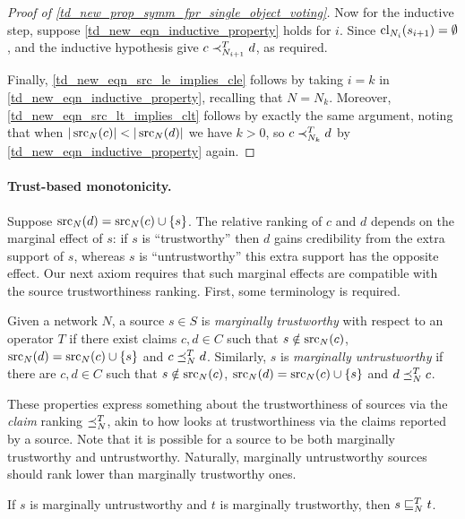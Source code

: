 \begin{proof}[Proof of \cref{td_new_prop_symm_fpr_single_object_voting}]
    Now for the inductive step, suppose \cref{td_new_eqn_inductive_property}
    holds for $i$. Since $\operatorname{cl}_{N_i}(s_{i + 1}) = \emptyset$,
    \freshposresp{} and the inductive hypothesis give $c \prec_{N_{i + 1}}^T d$,
    as required.

    Finally, \cref{td_new_eqn_src_le_implies_cle} follows by taking $i = k$ in
    \cref{td_new_eqn_inductive_property}, recalling that $N = N_k$. Moreover,
    \cref{td_new_eqn_src_lt_implies_clt} follows by exactly the same argument,
    noting that when $|\operatorname{src}_N(c)| < |\operatorname{src}_N(d)|$ we have $k > 0$, so $c
    \prec_{N_k}^T d$ by \cref{td_new_eqn_inductive_property} again.
\end{proof}

\paragraph{Trust-based monotonicity.}

Suppose $\operatorname{src}_N(d) = \operatorname{src}_N(c) \cup \{s\}$. The relative ranking of $c$ and
$d$ depends on the marginal effect of $s$: if $s$ is ``trustworthy'' then $d$
gains credibility from the extra support of $s$, whereas $s$ is
``untrustworthy'' this extra support has the opposite effect. Our next axiom
requires that such marginal effects are compatible with the source
trustworthiness ranking. First, some terminology is required.

\begin{definition}
    Given a network $N$, a source $s \in S$ is \emph{marginally trustworthy}
    with respect to an operator $T$ if there exist claims $c, d \in C$ such
    that $s \notin \operatorname{src}_N(c)$, $\operatorname{src}_N(d) = \operatorname{src}_N(c) \cup \{s\}$ and $c
    \preceq_N^T d$.
    Similarly, $s$ is \emph{marginally untrustworthy} if there are $c, d  \in
    C$ such that $s \notin \operatorname{src}_N(c)$, $\operatorname{src}_N(d) = \operatorname{src}_N(c) \cup \{s\}$ and
    $d \preceq_N^T c$.
\end{definition}

These properties express something about the trustworthiness of sources
via the \emph{claim} ranking $\preceq_N^T$, akin to how \sourcecoherence{} looks
at trustworthiness via the claims reported by a source. Note that it is
possible for a source to be both marginally trustworthy and untrustworthy.
Naturally, marginally untrustworthy sources should rank lower than marginally
trustworthy ones.

\begin{axiom}[\marginaltrustworthiness{}]
    If $s$ is marginally untrustworthy and $t$ is marginally trustworthy, then
    $s \sqsubseteq_N^T t$.
\end{axiom}

